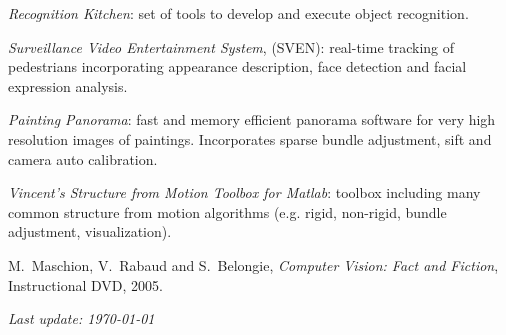 \begin{llist}
{\em Recognition Kitchen}: set of tools to develop and execute object recognition.

{\em Surveillance Video Entertainment System}, (SVEN): real-time tracking of pedestrians incorporating appearance 
description, face detection and facial expression analysis.

{\em Painting Panorama}: fast and memory efficient panorama software for very high resolution images of paintings.  Incorporates sparse bundle adjustment, sift and camera auto calibration.

{\em Vincent's Structure from Motion Toolbox for Matlab}: toolbox including many common structure from motion algorithms (e.g. rigid, non-rigid, bundle adjustment, visualization).





M.~Maschion, V.~Rabaud and S.~Belongie, {\em Computer Vision: Fact and Fiction},
Instructional DVD, 2005.





\end{llist}

{\em Last update: \today}


